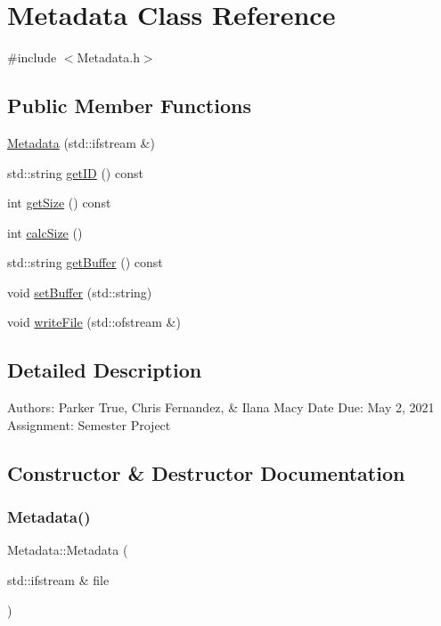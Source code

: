 \hypertarget{classMetadata}{}\section{Metadata Class Reference}
\label{classMetadata}


{\ttfamily \#include $<$Metadata.\+h$>$}

\subsection*{Public Member Functions}
\begin{DoxyCompactItemize}
\item 
\hyperlink{classMetadata_a1877568b5463425c93532224b6bf6950}{Metadata} (std\+::ifstream \&)
\item 
std\+::string \hyperlink{classMetadata_a3567498d73b473be0b3d6ba505067f9c}{get\+ID} () const
\item 
int \hyperlink{classMetadata_a358f06aba81e46be0f8deb7bb69b1f01}{get\+Size} () const
\item 
int \hyperlink{classMetadata_a039be0a66dabf1ea223790066ab6d430}{calc\+Size} ()
\item 
std\+::string \hyperlink{classMetadata_a59e34c51d464ab8e123e28abf8ef2e67}{get\+Buffer} () const
\item 
void \hyperlink{classMetadata_ae117e7b7973744baeb0faac3db705ba0}{set\+Buffer} (std\+::string)
\item 
void \hyperlink{classMetadata_a940cbd072f1b20e8f4c81806bad87f2c}{write\+File} (std\+::ofstream \&)
\end{DoxyCompactItemize}


\subsection{Detailed Description}
Authors\+: Parker True, Chris Fernandez, \& Ilana Macy Date Due\+: May 2, 2021 Assignment\+: Semester Project 

\subsection{Constructor \& Destructor Documentation}
\mbox{\label{classMetadata_a1877568b5463425c93532224b6bf6950}} 
\subsubsection{\texorpdfstring{Metadata()}{Metadata()}}
{\footnotesize\ttfamily Metadata\+::\+Metadata (\begin{DoxyParamCaption}\item[{std\+::ifstream \&}]{file }\end{DoxyParamCaption})}

